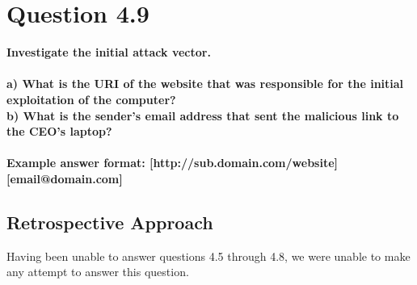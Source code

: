 \section{Question 4.9}
\textbf{Investigate the initial attack vector.
\\
\\a) What is the URI of the website that was responsible for the initial
exploitation of the computer?
\\b) What is the sender's email address that sent the malicious link to the
CEO's laptop?
\\\\
Example answer format: [http://sub.domain.com/website] [email@domain.com]}
\subsection{Retrospective Approach}
Having been unable to answer questions 4.5 through 4.8, we were unable to make any attempt to answer this question.
